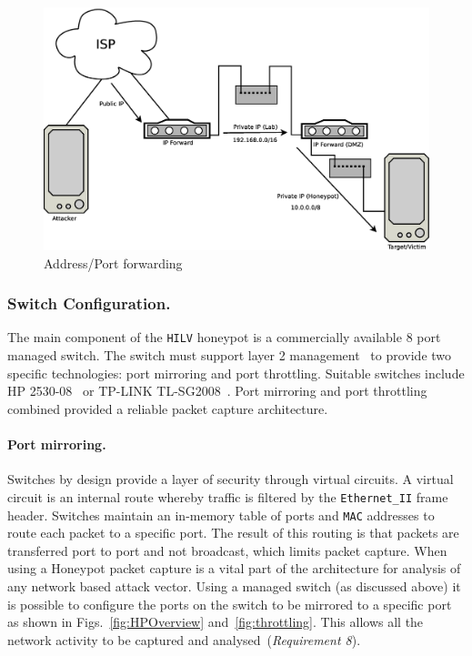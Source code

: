 \documentclass{llncs}
\begin{document}
\begin{figure}[h]
\begin{center}
	\includegraphics[scale=0.25]{Images/Forward.eps}
\caption{Address/Port forwarding}
\label{fig:Forward}
\end{center}
\end{figure}

\subsubsection{Switch Configuration.}

The main component of the \texttt{HILV} honeypot is a commercially available 8
port managed switch. The switch must support layer 2 management~\cite{ST:98} to
provide two specific technologies: port mirroring and port throttling. Suitable
switches include HP 2530-08~\cite{HP:17} or TP-LINK TL-SG2008~\cite{TP:17}.
Port mirroring and port throttling combined provided a reliable packet capture
architecture. 

\paragraph{Port mirroring.}
Switches by design provide a layer of security through virtual
circuits. A virtual circuit is an internal route whereby traffic is filtered by
the \texttt{Ethernet\_II} frame header. Switches maintain an in-memory table of
ports and \texttt{MAC} addresses to route each packet to a specific port. The
result of this routing is that packets are transferred port to port and not
broadcast, which limits packet capture. When using a Honeypot packet capture is
a vital part of the architecture for analysis of any network based attack
vector. Using a managed switch (as discussed above) it is possible to configure
the ports on the switch to be mirrored to a specific port as shown in
Figs.~\ref{fig:HPOverview} and~\ref{fig:throttling}. This allows all the
network activity to be captured and analysed~(\emph{Requirement 8}).
\end{document}
